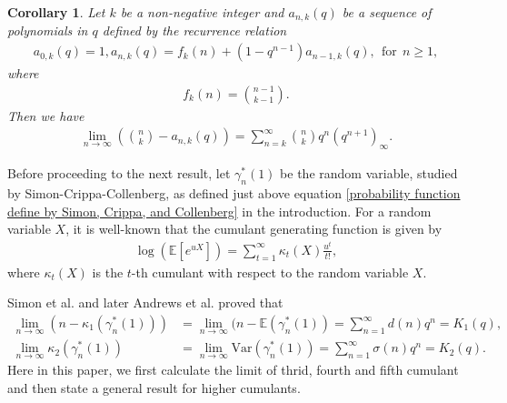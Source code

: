 \documentclass[11pt,reqno]{amsart}
\renewcommand{\(}{\left\(}
\renewcommand{\)}{\right\)}
\renewcommand{\[}{\left\[}
\renewcommand{\]}{\right\]}
\numberwithin{equation}{section}
\theoremstyle{plain}
\newtheorem{corollary}[theorem]{Corollary}
\begin{document}
\begin{corollary}\label{Limiting exp for Dilcher}
Let $k$ be a non-negative integer and $a_{n,k}(q)$ be a sequence of polynomials in $q$ defined by the recurrence relation
\begin{align}\label{a_n,k for Dilcher}
a_{0,k}(q)=1,   a_{n,k}(q) = f_k(n) +  (1- q^{n-1}) a_{n-1,k}(q), ~~ \textrm{for}~~ n \geq 1,  
\end{align}
where 
\begin{align}\label{f_k(n) for Dilcher}
f_k(n) = {n-1 \choose k-1}. 
\end{align}
Then we have
\begin{align}\label{limit form_Dilcher}
\lim_{n \rightarrow \infty} \left(  {n \choose k} - a_{n, k}(q)  \right)  = \sum_{n=k}^\infty {n\choose k} q^n(q^{n+1})_\infty.   
\end{align}


\end{corollary}
Before proceeding to the next result,  let $\gamma_n^*(1)$ be the random variable, studied by Simon-Crippa-Collenberg, as defined just above equation \eqref{probability function define by Simon, Crippa, and Collenberg} in the introduction.     For a random variable $X$,  it is well-known that the cumulant generating function is given by 
\begin{align}\label{cumulant generating function}
\log\left( \mathbb{E}[e^{u X}] \right) = \sum_{t=1}^\infty \kappa_t(X) \frac{u^t}{t!},
\end{align}
where $\kappa_t(X)$ is the $t$-th cumulant with respect to the random variable $X$.  

Simon et al. \cite[p.~7,  Equation (18)]{SCC1993} and later Andrews et al.  \cite[p.~52,  Equation (36)]{andrewssiam1997} proved that
\begin{align}
\lim_{n\rightarrow \infty}(n- \kappa_1(\gamma_n^*(1)))&=\lim_{n\rightarrow \infty}(n-\mathbb{E}(\gamma^*_n(1))=\sum_{n=1}^\infty d(n) q^n=K_1(q),\label{kappa_1} \\
\lim_{n\rightarrow \infty}\kappa_2(\gamma_n^*(1))&=\lim_{n\rightarrow \infty} \mathrm{Var}(\gamma^*_n(1))=\sum_{n=1}^\infty \sigma(n)q^n=K_2(q). \label{kappa_2}
\end{align}
Here in this paper, we first calculate the limit of thrid, fourth and fifth cumulant and then state a general result for higher cumulants.
\end{document}
